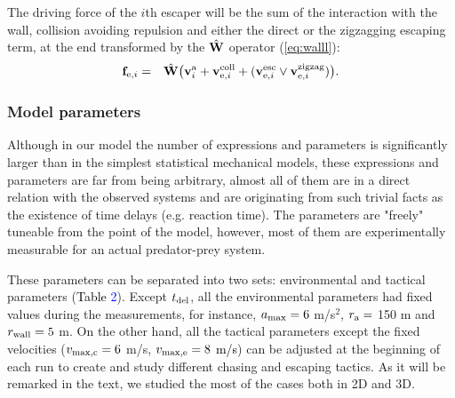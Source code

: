 \documentclass[12pt,a4paper,final]{iopart}
\newcommand{\revision}{\textcolor{black}}
\begin{document}
The driving force of the $i$th escaper will be the sum of the interaction with the wall, collision avoiding repulsion and either the direct or the zigzagging escaping term, at the end transformed by the $\hat{\rm \bf W}$ operator (\ref{eq:walll}):
\begin{eqnarray}
{\bf f}_{{\rm e}, i} &=& \hat{\rm \bf W} \big({\bf v}_i^{\rm a} + {\bf v}_{{\rm e}, i}^{\rm coll}+ ( {\bf v}_{{\rm e}, i}^{\rm esc} \lor {\bf v}_{{\rm e}, i}^{\rm zigzag} ) \big).
\end{eqnarray}

\subsubsection{Model parameters}

Although in our model the number of expressions and parameters is significantly larger than in the simplest statistical mechanical models, these expressions and parameters are far from being arbitrary, almost all of them are in a direct relation with the observed systems and are originating from such trivial facts as the existence of time delays (e.g. reaction time). The parameters are "freely" tuneable from the point of the model, however, most of them are experimentally measurable for an actual predator-prey system.

 These parameters can  be separated into two sets: environmental and tactical parameters (\revision{Table} \textcolor{blue}{2}). Except $t_{\rm del}$, all the environmental parameters had fixed values during the measurements, for instance, $a_{\rm max} = 6$ m/s$^2$, $r_{\rm a} =$ 150 m and $ r_{\rm wall} = 5$ m. On the other hand, all the tactical parameters except the fixed velocities ($v_{\rm max,c}= 6$ m/s, \revision{$v_{\rm max,e} =  8$ m/s}) can be adjusted at the beginning of each run to create and study different chasing and escaping tactics. As it will be remarked in the text, we studied the most of the cases both in 2D and 3D. 
\end{document}
